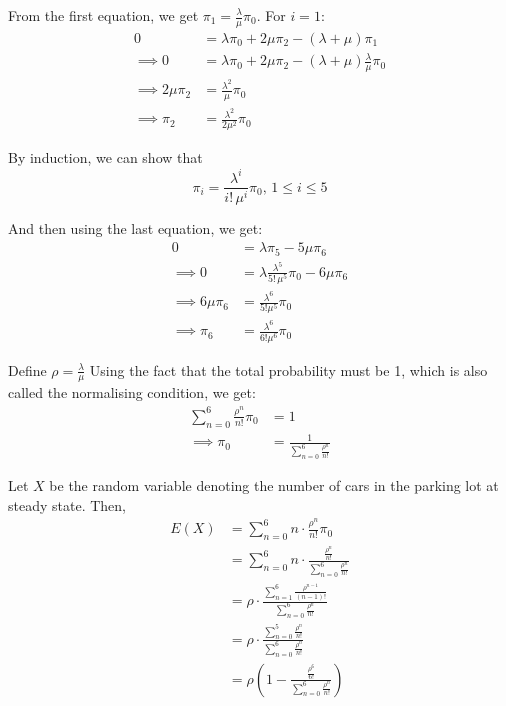 \documentclass[12pt, oneside]{article}
\begin{document}
\begin{enumerate}
{    From the first equation, we get \(\pi_1 = \frac{\lambda}{\mu}\pi_0\).
    For \(i = 1\):
    \begin{align*}
        0 &= \lambda \pi_{0} + 2\mu \pi_{2} - (\lambda + \mu) \pi_1 \\
        \implies 0 &= \lambda \pi_{0} + 2\mu \pi_{2} - (\lambda + \mu) \frac{\lambda}{\mu}\pi_0 \\
        \implies 2\mu \pi_2 &= \frac{\lambda^2}{\mu} \pi_0 \\
        \implies \pi_2 &= \frac{\lambda^2}{2\mu^2} \pi_0
    \end{align*}

    By induction, we can show that
    \[\pi_i = \frac{\lambda^i}{i!\,\mu^i} \pi_0,\, 1 \leq i \leq 5\]

    And then using the last equation, we get:
    \begin{align*}
        0 &= \lambda \pi_5 - 5\mu \pi_6 \\
        \implies 0 &= \lambda \frac{\lambda^5}{5!\,\mu^5} \pi_0 - 6\mu \pi_6 \\
        \implies 6\mu \pi_6 &= \frac{\lambda^6}{5!\mu^5} \pi_0 \\
        \implies \pi_6 &= \frac{\lambda^6}{6!\mu^6} \pi_0
    \end{align*}

    Define \(\rho = \frac{\lambda}{\mu}\)
    Using the fact that  the total probability must be 1, which is also called the
    normalising condition, we get:
    \begin{align*}
        \sum_{n = 0}^{6} \frac{\rho^n}{n!} \pi_0 &= 1 \\
        \implies \pi_0 &= \frac{1}{\sum_{n = 0}^{6} \frac{\rho^n}{n!}}
    \end{align*}

    Let \(X\) be the random variable denoting the number of cars in the parking lot
    at steady state. Then,
    \begin{align*}
        E(X) &= \sum_{n = 0}^{6} n \cdot \frac{\rho^n}{n!} \pi_0 \\
             &= \sum_{n = 0}^{6} n \cdot \frac{\frac{\rho^n}{n!}}{\sum_{n = 0}^{6} \frac{\rho^n}{n!}} \\
             &= \rho \cdot \frac{\sum_{n=1}^{6} \frac{\rho^{n-1}}{(n-1)!}}{\sum_{n = 0}^{6} \frac{\rho^n}{n!}} \\
             &= \rho \cdot \frac{\sum_{n=0}^{5} \frac{\rho^{n}}{n!}}{\sum_{n = 0}^{6} \frac{\rho^n}{n!}} \\
             &= \rho \left(1 - \frac{\frac{\rho^6}{6!}}
                                    {\sum_{n = 0}^{6} \frac{\rho^n}{n!}}\right)        
    \end{align*}

}
\end{enumerate}
\end{document}
